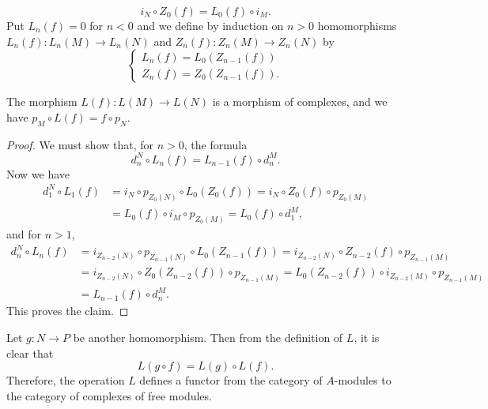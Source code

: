 \[i_N\circ Z_0(f)=L_0(f)\circ i_M.\]
Put $L_n(f)=0$ for $n<0$ and we define by induction on $n>0$ homomorphisms $L_n(f):L_n(M)\to L_n(N)$ and $Z_n(f):Z_n(M)\to Z_n(N)$ by
\[\begin{cases}
L_n(f)=L_0(Z_{n-1}(f))\\
Z_n(f)=Z_0(Z_{n-1}(f)).
\end{cases}\]
\begin{proposition}\label{module complex canonical free resolution functor}
The morphism $L(f):L(M)\to L(N)$ is a morphism of complexes, and we have $p_M\circ L(f)=f\circ p_N$.
\end{proposition}
\begin{proof}
We must show that, for $n>0$, the formula
\[d_n^N\circ L_n(f)=L_{n-1}(f)\circ d_n^M.\]
Now we have
\begin{align*}
d_1^N\circ L_1(f)&=i_N\circ p_{Z_0(N)}\circ L_0(Z_0(f))=i_N\circ Z_0(f)\circ p_{Z_0(M)}\\
&=L_0(f)\circ i_M\circ p_{Z_0(M)}=L_0(f)\circ d_1^M,
\end{align*}
and for $n>1$, 
\begin{align*}
d_n^N\circ L_n(f)&=i_{Z_{n-2}(N)}\circ p_{Z_{n-1}(N)}\circ L_0(Z_{n-1}(f))=i_{Z_{n-2}(N)}\circ Z_{n-2}(f)\circ p_{Z_{n-1}(M)}\\
&=i_{Z_{n-2}(N)}\circ Z_0(Z_{n-2}(f))\circ p_{Z_{n-1}(M)}=L_0(Z_{n-2}(f))\circ i_{Z_{n-2}(M)}\circ p_{Z_{n-1}(M)}\\
&=L_{n-1}(f)\circ d_n^M.
\end{align*}
This proves the claim.
\end{proof}
Let $g:N\to P$ be another homomorphism. Then from the definition of $L$, it is clear that
\[L(g\circ f)=L(g)\circ L(f).\]
Therefore, the operation $L$ defines a functor from the category of $A$-modules to the category of complexes of free modules.
